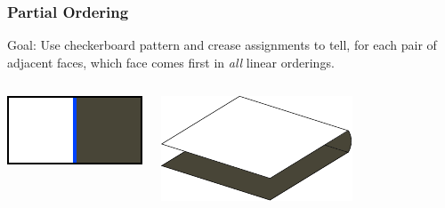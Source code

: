 \documentclass{beamer}
\begin{document}
\begin{frame}
\frametitle{Partial Ordering}
\begin{block}{Goal:}
Use checkerboard pattern and crease assignments to tell, for each pair of adjacent faces, which face comes first in \textit{all} linear orderings.
\end{block}

\bigskip

\begin{columns}[c]
\includegraphics[width=\textwidth]{sam_images/cboard-mountain-tile.pdf}

\pause

\includegraphics[width=.9\textwidth]{sam_images/checkerboard-3d.pdf}

\end{columns}

\end{frame}

\end{document}
